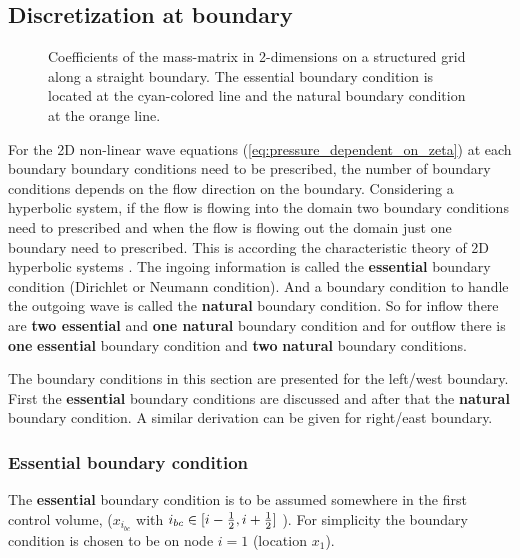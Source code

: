 \subsection{Discretization at boundary}
\begin{figure}[H]
    \begin{center}
        \def\svgwidth{0.80\textwidth} %
        \resizebox{0.65\textwidth}{!}{
            
        }
    \end{center}
    \caption[Definition of the grid to solve the 2D-shallow water equations at the boundary]{Coefficients of the mass-matrix in 2-dimensions on a structured grid along a straight boundary. The essential boundary condition is located at the cyan-colored line and the natural boundary condition at the orange line.}
    \label{fig:structured_grid_along_straight_boundary}
\end{figure}
For the 2D non-linear wave equations (\autoref{eq:pressure_dependent_on_zeta}) at each boundary boundary conditions need to be prescribed, the number of boundary conditions depends on the flow direction on the boundary.
Considering a hyperbolic system, if the flow is flowing into the domain two boundary conditions need to prescribed and when the flow is flowing out the domain just one boundary need to prescribed.
This is according the characteristic theory of 2D hyperbolic systems \citep{DaubertEtGraffe1967}.
The ingoing information is called the \textbf{essential} boundary condition (Dirichlet or Neumann condition).
And a boundary condition to handle the outgoing wave is called the \textbf{natural} boundary condition.
So for inflow there are \textbf{two essential} and \textbf{one natural} boundary condition and for outflow there is \textbf{one} \textbf{essential} boundary condition and \textbf{two} \textbf{natural} boundary conditions.

The boundary conditions in this section are presented for the left/west boundary.
First the \textbf{essential} boundary conditions are discussed and after that the \textbf{natural} boundary condition.
A similar derivation can be given for right/east boundary.

\subsubsection{Essential boundary condition}
The \textbf{essential} boundary condition is to be assumed somewhere in the first control volume, ($x_{i_{bc}}$ with $i_{bc} \in [i-\frac{1}{2}, i+\frac{1}{2}]$ ).
For simplicity the boundary condition is chosen to be on node $i=1$ (location $x_{1}$).


